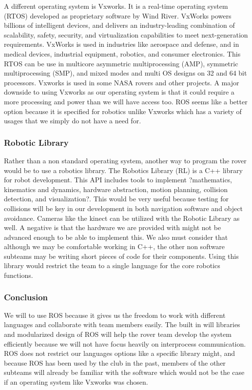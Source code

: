 \documentclass[10pt, oneside,onecolumn]{IEEEtran}
\begin{document}
	A different operating system is Vxworks. It is a real-time operating system (RTOS) developed as proprietary software by Wind River. VxWorks powers billions of intelligent devices, and delivers an industry-leading combination of scalability, safety, security, and virtualization capabilities to meet next-generation requirements. VxWorks is used in industries like aerospace and defense, and in medical devices, industrial equipment, robotics, and consumer electronics. This RTOS can be use in multicore asymmetric multiprocessing (AMP), symmetric multiprocessing (SMP), and mixed modes and multi OS designs on 32 and 64 bit processors. Vxworks is used in some NASA rovers and other projects. A major downside to using Vxworks as our operating system is that it could require a more processing and power than we will have access too. ROS seems like a better option because it is specified for robotics unlike Vxworks which has a variety of usages that we simply do not have a need for.

\subsubsection{Robotic Library}

	Rather than a non standard operating system, another way to program the rover would be to use a robotics library. The Robotics Library (RL) is a C++ library for robot development. This API includes tools to implement ?mathematics, kinematics and dynamics, hardware abstraction, motion planning, collision detection, and visualization?. This would be very useful because testing for collisions will be key in our development in both navigation software and object avoidance. Cameras like the kinect can be utilized with the Robotic Library as well. A negative is that the hardware we are provided with might not be advanced enough to be able to implement this. We also must consider that although we may be comfortable working in C++, the other non software subteams may be writing short pieces of code for their components. Using this library would restrict the team to a single language for the core robotics functions. 

\subsubsection{Conclusion}

	We will to use ROS because it gives us the freedom to work with different languages and collaborate with team members easily. The built in will libraries and modularized design of ROS will help the rover team develop the system efficiently because we will not have focus heavily on interprocess communication. ROS does not restrict our languages options like a specific library might, and because ROS has been used by the club in the past, members of the other subteams will already be familiar with the software which would not be the case if an operating system like Vxworks was chosen. 
\end{document}
